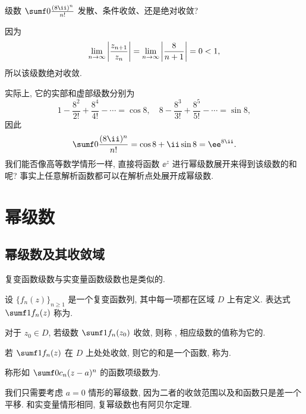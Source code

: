 \begin{example}
  级数 $\sumf0 \frac{(8\ii)^n}{n!}$ 发散、条件收敛、还是绝对收敛?
\end{example}

\begin{solution}
  因为
  \[
     \lim_{n\rightarrow\infty}\left|\frac{z_{n+1}}{z_n}\right|
    =\lim_{n\rightarrow\infty}\left|\dfrac{8}{n+1}\right|
    =0<1,
  \]
  所以该级数绝对收敛.
\end{solution}

实际上, 它的实部和虚部级数分别为
\[
  1-\frac{8^2}{2!}+\frac{8^4}{4!}-\cdots=\cos 8,\quad
  8-\frac{8^3}{3!}+\frac{8^5}{5!}-\cdots=\sin 8,
\]
因此
\[
   \sumf0 \frac{(8\ii)^n}{n!}
  =\cos 8+\ii \sin 8
  =\ee^{8\ii}.
\]
我们能否像高等数学情形一样, 直接将函数 $\ee^z$ 进行幂级数展开来得到该级数的和呢?
事实上任意解析函数都可以在解析点处展开成幂级数.



\section{幂级数}

\subsection{幂级数及其收敛域}

复变函数级数与实变量函数级数也是类似的.

\begin{definition}
  \begin{enumpar}
    \item 设 $\{f_n(z)\}_{n\ge 1}$ 是一个复变函数列, 其中每一项都在区域 $D$ 上有定义.
    表达式 $\sumf1 f_n(z)$ 称为.
    \item 对于 $z_0\in D$, 若级数 $\sumf1 f_n(z_0)$ 收敛, 则称 , 相应级数的值称为它的.
    \item 若 $\sumf1 f_n(z)$ 在 $D$ 上处处收敛, 则它的和是一个函数, 称为.
  \end{enumpar}
\end{definition}

\begin{definition}
  称形如 $\sumf0 c_n(z-a)^n$ 的函数项级数为.\footnotemark
\end{definition}

我们只需要考虑 $a=0$ 情形的幂级数, 因为二者的收敛范围以及和函数只是差一个平移.
和实变量情形相同, 复幂级数也有阿贝尔定理.

